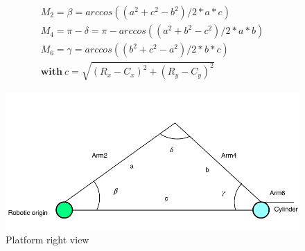 \begin{equation}
\begin{aligned}
M_2=\beta=arccos((a^2+c^2-b^2)/2*a*c)\\
M_4=\pi-\delta=\pi-arccos((a^2+b^2-c^2)/2*a*b)\\
M_6=\gamma=arccos((b^2+c^2-a^2)/2*b*c)\\
\textbf{with}\ c=\sqrt{(R_x-C_x)^2+(R_y-C_y)^2}
\end{aligned}
\end{equation}

\begin{figure}[tpb]
\centering
	\includegraphics[width=0.96\linewidth]{figures/right_v.pdf} 
	\caption{Platform right view}
	\vspace{-0.4cm}
	\label{fig:right}
\end{figure}



